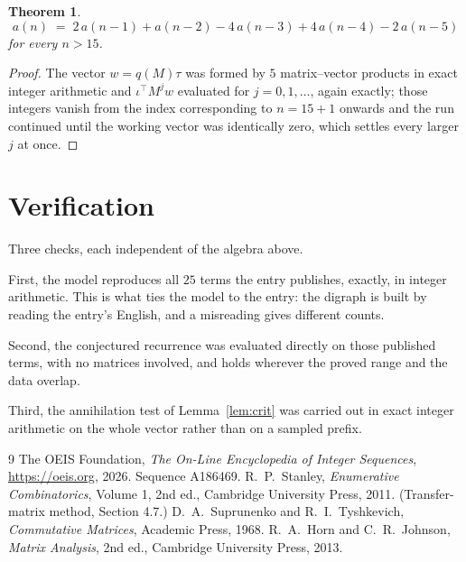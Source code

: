 \documentclass[11pt,a4paper]{article}
\theoremstyle{plain}
\newtheorem{theorem}{Theorem}
\theoremstyle{definition}
\begin{document}
\begin{theorem}
\[
a(n)\;=\;2\,a(n-1) + a(n-2) - 4\,a(n-3) + 4\,a(n-4) - 2\,a(n-5)
\]
for every $n>15$.
\end{theorem}

\begin{proof}
The vector $w=q(M)\tau$ was formed by $5$ matrix--vector products in exact integer
arithmetic and $\iota^{\!\top}M^{j}w$ evaluated for $j=0,1,\dots$, again exactly; those
integers vanish from the index corresponding to $n=15+1$ onwards and the run continued
until the working vector was identically zero, which settles every larger $j$ at once.
\end{proof}

\section{Verification}

Three checks, each independent of the algebra above.

First, the model reproduces all $25$ terms the entry publishes, exactly, in integer
arithmetic. This is what ties the model to the entry: the digraph is built by reading the
entry's English, and a misreading gives different counts.

Second, the conjectured recurrence was evaluated directly on those published terms, with no
matrices involved, and holds wherever the proved range and the data overlap.

Third, the annihilation test of Lemma~\ref{lem:crit} was carried out in exact integer
arithmetic on the whole vector rather than on a sampled prefix.

\begin{thebibliography}{9}
 The OEIS Foundation, \emph{The On-Line Encyclopedia of Integer
Sequences}, \url{https://oeis.org}, 2026. Sequence A186469.
 R.~P.~Stanley, \emph{Enumerative Combinatorics}, Volume 1, 2nd ed.,
Cambridge University Press, 2011. (Transfer-matrix method, Section 4.7.)
 D.~A.~Suprunenko and R.~I.~Tyshkevich, \emph{Commutative Matrices},
Academic Press, 1968.
 R.~A.~Horn and C.~R.~Johnson, \emph{Matrix Analysis}, 2nd ed., Cambridge
University Press, 2013.
\end{thebibliography}
\end{document}

